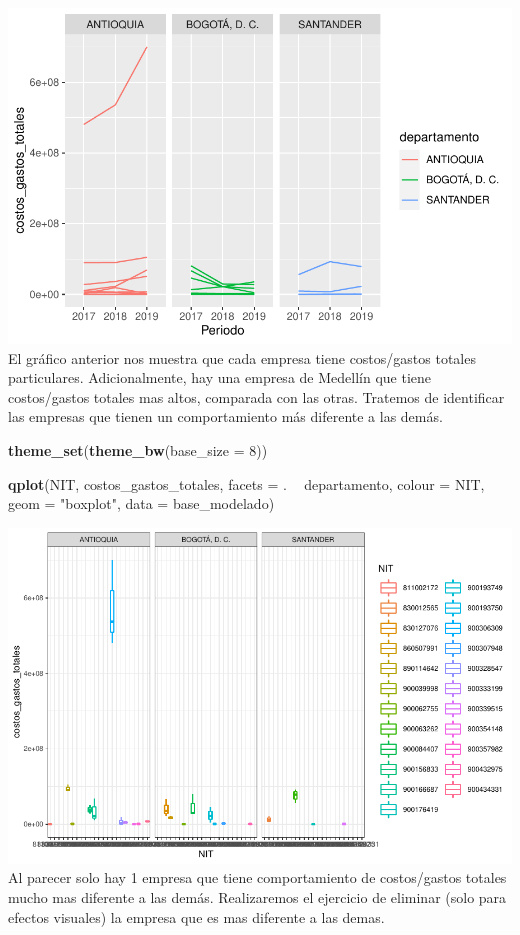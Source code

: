 \documentclass[
  11pt,
  a4paper,
]{book}
\newenvironment{Shaded}{\begin{snugshade}}{\end{snugshade}}
\newcommand{\DataTypeTok}[1]{\textcolor[rgb]{0.13,0.29,0.53}{#1}}
\newcommand{\DecValTok}[1]{\textcolor[rgb]{0.00,0.00,0.81}{#1}}
\newcommand{\KeywordTok}[1]{\textcolor[rgb]{0.13,0.29,0.53}{\textbf{#1}}}
\newcommand{\NormalTok}[1]{#1}
\newcommand{\OperatorTok}[1]{\textcolor[rgb]{0.81,0.36,0.00}{\textbf{#1}}}
\newcommand{\StringTok}[1]{\textcolor[rgb]{0.31,0.60,0.02}{#1}}
\begin{document}
\includegraphics{index_files/figure-latex/unnamed-chunk-51-1.pdf} El
gráfico anterior nos muestra que cada empresa tiene costos/gastos
totales particulares. Adicionalmente, hay una empresa de Medellín que
tiene costos/gastos totales mas altos, comparada con las otras. Tratemos
de identificar las empresas que tienen un comportamiento más diferente a
las demás.

\begin{Shaded}
\begin{Highlighting}[]
\KeywordTok{theme_set}\NormalTok{(}\KeywordTok{theme_bw}\NormalTok{(}\DataTypeTok{base_size =} \DecValTok{8}\NormalTok{))}

\KeywordTok{qplot}\NormalTok{(NIT, costos_gastos_totales, }\DataTypeTok{facets =}\NormalTok{ . }\OperatorTok{~}\StringTok{ }\NormalTok{departamento, }
      \DataTypeTok{colour =}\NormalTok{ NIT, }\DataTypeTok{geom =} \StringTok{"boxplot"}\NormalTok{, }\DataTypeTok{data =}\NormalTok{ base_modelado)}
\end{Highlighting}
\end{Shaded}

\includegraphics{index_files/figure-latex/unnamed-chunk-52-1.pdf} Al
parecer solo hay 1 empresa que tiene comportamiento de costos/gastos
totales mucho mas diferente a las demás. Realizaremos el ejercicio de
eliminar (solo para efectos visuales) la empresa que es mas diferente a
las demas.
\end{document}
